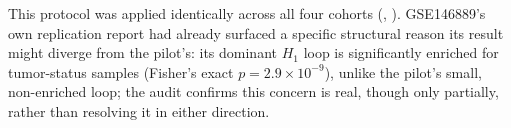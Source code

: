 This protocol was applied identically across all four cohorts (, ). GSE146889's own replication report had already surfaced a specific structural reason its result might diverge from the pilot's: its dominant $H_1$ loop is significantly enriched for tumor-status samples (Fisher's exact $p=2.9\times10^{-9}$), unlike the pilot's small, non-enriched loop; the audit confirms this concern is real, though only partially, rather than resolving it in either direction.
